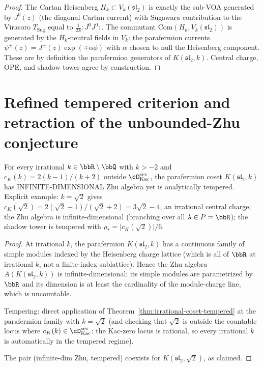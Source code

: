 \begin{proof}
The Cartan Heisenberg $H_k \subset V_k(\mathfrak{sl}_2)$ is exactly
the sub-VOA generated by $J^0(z)$ (the diagonal Cartan current) with
Sugawara contribution to the Virasoro $T_{\mathrm{Sug}}$ equal to
$\tfrac{1}{2 k} :\! J^0 J^0 \!:$. The commutant
$\mathrm{Com}(H_k, V_k(\mathfrak{sl}_2))$ is generated by the
$H_k$-neutral fields in $V_k$: the parafermion currents
$\psi^\pm(z) = J^\pm(z) \exp(\mp \alpha \phi)$ with $\alpha$ chosen
to null the Heisenberg component. These are by definition the
parafermion generators of $K(\mathfrak{sl}_2, k)$. Central charge,
OPE, and shadow tower agree by construction.
\end{proof}

\section{Refined tempered criterion and retraction of the
unbounded-Zhu conjecture}
\label{sec:refined-criterion}

\begin{proposition}
\label{prop:zhu-unbounded-tempered-nontrivial}
\ClaimStatusProvedHere
For every irrational $k \in \bbR \setminus \bbQ$ with $k > -2$ and
$c_K(k) = 2(k-1)/(k+2)$ outside
$\cD^{\mathrm{sev}}_{\mathrm{Kac}}$, the parafermion coset
$K(\mathfrak{sl}_2, k)$ has INFINITE-DIMENSIONAL Zhu algebra yet is
analytically tempered. Explicit example:
$k = \sqrt{2}$ gives $c_K(\sqrt{2}) = 2(\sqrt{2} - 1)/(\sqrt{2} + 2)
= 3 \sqrt{2} - 4$, an irrational central charge;
the Zhu algebra is infinite-dimensional (branching over all
$\lambda \in P = \bbR$); the shadow tower is tempered with
$\rho_* = \lvert c_K(\sqrt{2}) \rvert / 6$.
\end{proposition}

\begin{proof}
At irrational $k$, the parafermion $K(\mathfrak{sl}_2, k)$ has a
continuous family of simple modules indexed by the Heisenberg
charge lattice (which is all of $\bbR$ at irrational $k$, not a
finite-index sublattice). Hence the Zhu algebra $A(K(\mathfrak{sl}_2,
k))$ is infinite-dimensional: its simple modules are parametrized
by $\bbR$ and its dimension is at least the cardinality of the
module-charge line, which is uncountable.

Tempering: direct application of
Theorem~\ref{thm:irrational-coset-tempered} at the
$\mathrm{parafermion}$ family with $k = \sqrt{2}$ (and checking that
$\sqrt{2}$ is outside the countable locus where $c_K(k) \in
\cD^{\mathrm{sev}}_{\mathrm{Kac}}$: the Kac-zero locus is rational,
so every irrational $k$ is automatically in the tempered regime).

The pair (infinite-dim Zhu, tempered) coexists for $K(\mathfrak{sl}_2,
\sqrt{2})$, as claimed.
\end{proof}

